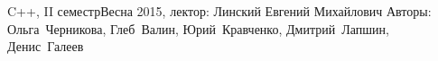 


\BigHeader
	{C++, II семестр}{Весна 2015, лектор: Линский Евгений Михайлович}
	{Авторы: Ольга~Черникова, Глеб~Валин, Юрий~Кравченко, Дмитрий~Лапшин, Денис~Галеев}

 
















